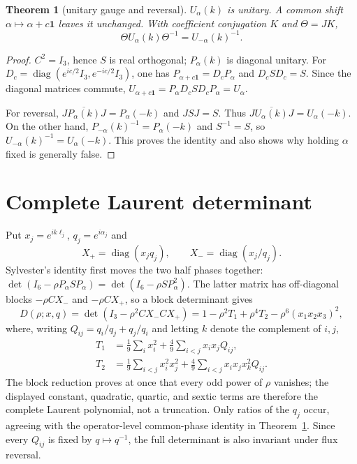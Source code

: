 \documentclass[11pt]{article}
\newtheorem{theorem}{Theorem}
\begin{document}
\begin{theorem}[unitary gauge and reversal]\label{thm:gauge}
$U_\alpha(k)$ is unitary.  A common shift
$\alpha\mapsto\alpha+c\mathbf1$ leaves it unchanged.  With coefficient
conjugation $K$ and $\Theta=JK$,
\[
 \Theta U_\alpha(k)\Theta^{-1}=U_{-\alpha}(k)^{-1}.
\]
\end{theorem}
\begin{proof}
$C^2=I_3$, hence $S$ is real orthogonal; $P_\alpha(k)$ is diagonal unitary.
For
$D_c=\operatorname{diag}(e^{ic/2}I_3,e^{-ic/2}I_3)$, one has
$P_{\alpha+c\mathbf1}=D_cP_\alpha$ and $D_cSD_c=S$.  Since the diagonal
matrices commute,
$U_{\alpha+c\mathbf1}=P_\alpha D_cSD_cP_\alpha=U_\alpha$.

For reversal, $J\overline{P_\alpha(k)}J=P_\alpha(-k)$ and $JSJ=S$.
Thus $J\overline{U_\alpha(k)}J=U_\alpha(-k)$.  On the other hand,
$P_{-\alpha}(k)^{-1}=P_\alpha(-k)$ and $S^{-1}=S$, so
$U_{-\alpha}(k)^{-1}=U_\alpha(-k)$.  This proves the identity and also
shows why holding $\alpha$ fixed is generally false.
\end{proof}

\section{Complete Laurent determinant}
Put $x_j=e^{ik\ell_j}$, $q_j=e^{i\alpha_j}$ and
\[
 X_+=\operatorname{diag}(x_jq_j),\qquad
 X_-=\operatorname{diag}(x_j/q_j).
\]
Sylvester's identity first moves the two half phases together:
$\det(I_6-\rho P_\alpha SP_\alpha)
=\det(I_6-\rho S P_\alpha^2)$.  The latter matrix has off-diagonal blocks
$-\rho CX_-$ and $-\rho CX_+$, so a block determinant gives
\[
 D(\rho;x,q)=\det(I_3-\rho^2CX_-CX_+)
 =1-\rho^2T_1+\rho^4T_2-\rho^6(x_1x_2x_3)^2,
\]
where, writing $Q_{ij}=q_i/q_j+q_j/q_i$ and letting $k$ denote the
complement of $i,j$,
\begin{align*}
 T_1&=\frac19\sum_i x_i^2+\frac49\sum_{i<j}x_ix_jQ_{ij},\\
 T_2&=\frac19\sum_{i<j}x_i^2x_j^2
      +\frac49\sum_{i<j}x_ix_jx_k^2Q_{ij}.
\end{align*}
The block reduction proves at once that every odd power of $\rho$ vanishes;
the displayed constant, quadratic, quartic, and sextic terms are therefore
the complete Laurent polynomial, not a truncation.  Only ratios of the
$q_j$ occur, agreeing with the operator-level common-phase identity in
Theorem~\ref{thm:gauge}.  Since every $Q_{ij}$ is fixed by
$q\mapsto q^{-1}$, the full determinant is also invariant under flux
reversal.
\end{document}

